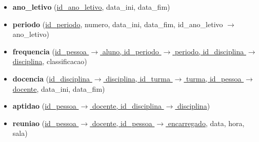 \documentclass[12pt,a4paper,reqno]{report}
\numberwithin{figure}{section}
\numberwithin{equation}{section}
\begin{document}
\begin{itemize}
\item \textbf{ano\_letivo} (\underline{id\_ano\_letivo}, data\_ini, data\_fim)

\item \textbf{periodo} (\underline{id\_periodo}, numero, data\_ini, data\_fim, id\_ano\_letivo $\rightarrow$ ano\_letivo)

\item \textbf{frequencia} (\underline{id\_pessoa $\rightarrow$ aluno, id\_periodo $\rightarrow$ periodo, id\_disciplina $\rightarrow$ disciplina}, classificacao)

\item \textbf{docencia} (\underline{id\_disciplina $\rightarrow$ disciplina, id\_turma $\rightarrow$ turma, id\_pessoa $\rightarrow$ docente}, data\_ini, data\_fim)

\item \textbf{aptidao} (\underline{id\_pessoa $\rightarrow$ docente, id\_disciplina $\rightarrow$ disciplina})

\item \textbf{reuniao} (\underline{id\_pessoa $\rightarrow$ docente, id\_pessoa $\rightarrow$ encarregado}, data, hora, sala)

\end{itemize}
\end{document}
